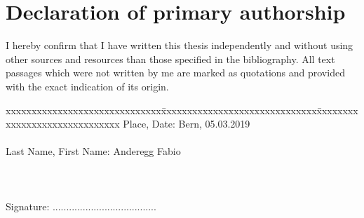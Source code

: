 \chapter*{Declaration of primary authorship}
\label{chap:declaration_authorship}

\vspace*{10mm} 

I hereby confirm that I have written this thesis independently and without using other sources and resources than those specified in the bibliography. All text passages which were not written by me are marked as quotations and provided with the exact indication of its origin.

\vspace{15mm}

\begin{tabbing}
xxxxxxxxxxxxxxxxxxxxxxxxxxxxxx\=xxxxxxxxxxxxxxxxxxxxxxxxxxxxxx\=xxxxxxxxxxxxxxxxxxxxxxxxxxxxxx\kill
Place, Date:		\> Bern, 05.03.2019 \\ \\ 
Last Name, First Name:	\> Anderegg Fabio	\\ \\ \\ \\ 
Signature:	\> ...................................... \\
\end{tabbing}
